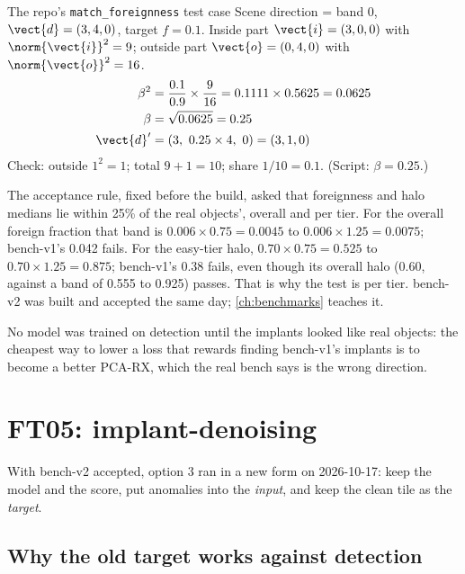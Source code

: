 \begin{worked}[label={we:ftruns:beta}]{The repo's \texttt{match\_foreignness} test case}
Scene direction = band 0, $\vect{d} = (3, 4, 0)$, target $f = 0.1$. Inside part $\vect{i} = (3, 0, 0)$ with
$\norm{\vect{i}}^2 = 9$; outside part $\vect{o} = (0, 4, 0)$ with $\norm{\vect{o}}^2 = 16$.
\begin{align*}
\beta^2 &= \frac{0.1}{0.9} \times \frac{9}{16} = 0.1111 \times 0.5625 = 0.0625\\
\beta &= \sqrt{0.0625} = 0.25\\
\vect{d}' &= (3,\ 0.25 \times 4,\ 0) = (3, 1, 0)
\end{align*}
Check: outside $1^2 = 1$; total $9 + 1 = 10$; share $1 / 10 = 0.1$. (Script: $\beta = 0.25$\tagC.)
\end{worked}

The acceptance rule, fixed before the build, asked that foreignness and halo medians lie within 25\% of the real
objects', overall and per tier. For the overall foreign fraction that band is $0.006 \times 0.75 = 0.0045$ to $0.006
\times 1.25 = 0.0075$; bench-v1's 0.042 fails. For the easy-tier halo, $0.70 \times 0.75 = 0.525$ to $0.70 \times 1.25
= 0.875$; bench-v1's 0.38 fails, even though its overall halo (0.60, against a band of 0.555 to 0.925) passes. That is
why the test is per tier. bench-v2 was built and accepted the same day; \cref{ch:benchmarks} teaches it.

\begin{keypoint}
No model was trained on detection until the implants looked like real objects: the cheapest way to lower a loss that
rewards finding bench-v1's implants is to become a better PCA-RX, which the real bench says is the wrong direction.
\end{keypoint}

\section{FT05: implant-denoising}\label{sec:ftruns:ft05}

With bench-v2 accepted, option 3 ran in a new form on 2026-10-17: keep the model and the score, put anomalies into the
\emph{input}, and keep the clean tile as the \emph{target}.

\subsection{Why the old target works against detection}

